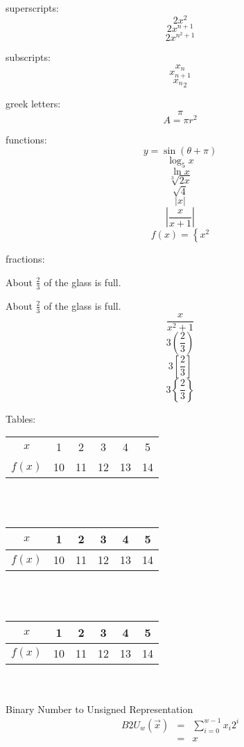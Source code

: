 \documentclass[11pt]{article}
\begin{document}
superscripts: 
$$2x^2$$
$$2x^{n+1}$$
$$2x^{n^2+1}$$

subscripts:
$$x_n$$
$$x_{n+1}$$
$${x_n}_2$$

greek letters:
$$\pi$$
$$A=\pi r^2$$

functions:
$$y=\sin{(\theta+\pi)}$$
$$\log_5{x}$$
$$\ln{x}$$
$$\sqrt[3]{2x}$$
$$\sqrt{4}$$
$$|x|$$
$$\left|\frac{x}{x+1}\right|$$
$$f(x)=\left\{x^2\right.$$

fractions:

About $\frac{2}{3}$ of the glass is full.

About $\displaystyle\frac{2}{3}$ of the glass is full.
$$\frac{x}{x^2+1}$$
$$3\left(\frac{2}{3}\right)$$
$$3\left[\frac{2}{3}\right]$$
$$3\left\{\frac{2}{3}\right\}$$

Tables:

\begin{tabular}{cccccc}
$x$ & 1 & 2 & 3 & 4 & 5\\
$f(x)$ & 10 & 11 & 12 & 13 & 14

\end{tabular}\\\\

\begin{tabular}{c|ccccc}
$x$ & 1 & 2 & 3 & 4 & 5\\ \hline
$f(x)$ & 10 & 11 & 12 & 13 & 14

\end{tabular}\\\\

\begin{tabular}{|c|c|c|c|c|c|}
\hline
$x$ & 1 & 2 & 3 & 4 & 5\\ \hline
$f(x)$ & 10 & 11 & 12 & 13 & 14 \\ \hline

\end{tabular}
\\\\
Binary Number to Unsigned Representation
\begin{eqnarray}
B2U_w(\vec{x})&=&\displaystyle \sum \limits_{i=0}^{w-1} x_{i} 2^i\\
&=& x
\end{eqnarray}
\end{document}
